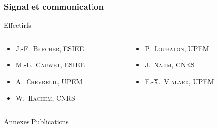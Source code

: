 \documentclass[]{beamer}
\begin{document}
\begin{frame}
  \frametitle{Signal et communication}

  \begin{block}{Effectirfs}
    \begin{columns}
      \begin{column}{0.5\textwidth}
        \begin{itemize}
          \item \textsc{J.-F.~Bercher}, ESIEE
          \item \textcolor{Nouveau}{\textsc{M.-L.~Cauwet}, ESIEE}
          \item \textsc{A.~Chevreuil}, UPEM
          \item \textsc{W.~Hachem}, CNRS
        \end{itemize}
      \end{column}
      \begin{column}{0.5\textwidth}
        \begin{itemize}
          \item \textsc{P.~Loubaton}, UPEM
          \item \textsc{J.~Najim}, CNRS
          \item \alert{\textsc{F.-X.~Vialard}, UPEM}
        \end{itemize}
      \end{column}
    \end{columns}
  \end{block}
\end{frame}


\begin{frame}[label=conclusion, standout]{Annexes}
  Publications
\end{frame}

\end{document}
